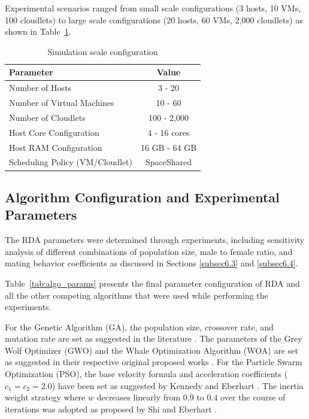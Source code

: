 \documentclass[pdflatex,sn-mathphys-num]{sn-jnl}%
\begin{document}
Experimental scenarios ranged from small scale configurations (3 hosts, 10 VMs, 100 cloudlets) to large scale configurations (20 hosts, 60 VMs, 2,000 cloudlets) as shown in Table~\ref{tab_scale}.
 
\begin{table}[htbp]
\centering
\caption{Simulation scale configuration}\label{tab_scale}
\begin{tabular*}{\textwidth}{@{\extracolsep\fill}lc}
\toprule
Parameter & Value \\
\midrule
Number of Hosts & 3 - 20 \\
Number of Virtual Machines & 10 - 60 \\
Number of Cloudlets & 100 - 2,000 \\
Host Core Configuration & 4 - 16 cores \\
Host RAM Configuration & 16 GB - 64 GB \\
Scheduling Policy (VM/Cloudlet) & SpaceShared \\
\bottomrule
\end{tabular*}
\end{table}
 
\subsection{Algorithm Configuration and Experimental Parameters}\label{subsec5.2}
 
The RDA parameters were determined through experiments, including sensitivity analysis of different combinations of population size, male to female ratio, and mating behavior coefficients as discussed in Sections \ref{subsec6.3} and \ref{subsec6.4}.

Table~\ref{tab:algo_params} presents the final parameter configuration of RDA and all the other competing algorithms that were used while performing the experiments.

For the Genetic Algorithm (GA), the population size, crossover rate, and mutation rate are set as suggested in the literature \cite{hassanat2019GA, GA}. The parameters of the Grey Wolf Optimizer (GWO) and the Whale Optimization Algorithm (WOA) are set as suggested in their respective original proposed works \cite{mirjalili2014grey, Mirjalili2016WOA}. For the Particle Swarm Optimization (PSO), the base velocity formula and acceleration coefficients ($c_1 = c_2 = 2.0$) have been set as suggested by Kennedy and Eberhart \cite{Kennedy1995}. The inertia weight strategy where $w$ decreases linearly from $0.9$ to $0.4$ over the course of iterations was adopted as proposed by Shi and Eberhart \cite{shi1998modifiedPSO}.
\end{document}
